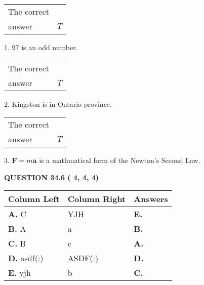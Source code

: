 \documentclass[12pt]{article}
\begin{document}
 
\noindent\begin{tabular}{|l|l|}\hline The correct & \\
          answer &  %
$T$ \\ \hline \end{tabular}
1. $ %
97$ is an  %
odd number.
 
\noindent\begin{tabular}{|l|l|}\hline The correct & \\
          answer &  %
$T$ \\ \hline \end{tabular}
2.  %
Kingston is in  %
Ontario province.
 
\noindent\begin{tabular}{|l|l|}\hline The correct & \\
          answer &  %
$T$ \\ \hline \end{tabular}
3.  %
$\mathbf{F}=m\mathbf{a}$ is a mathmatical form of  %
the Newton's Second Law.
 
 
 
  
\vspace{0.2in}
  
{\textbf{\Large{QUESTION
34.6 
 (          4,          4,          4)
}}}
  
  
 
 
\noindent{}
  
  
\begin{tabular}{|l|l|l|}
 \hline
 Column Left & Column Right  & Answers       \\ 
 \hline
{\textbf{\large{
A.}}}
C
  & 
YJH
 & 
{\textbf{\large{
E.}}}
 \\ 
 \hline
{\textbf{\large{
B.}}}
A
  & 
a
 & 
{\textbf{\large{
B.}}}
 \\ 
 \hline
{\textbf{\large{
C.}}}
B
  & 
c
 & 
{\textbf{\large{
A.}}}
 \\ 
 \hline
{\textbf{\large{
D.}}}
asdf(:)
  & 
ASDF(:)
 & 
{\textbf{\large{
D.}}}
 \\ 
 \hline
{\textbf{\large{
E.}}}
yjh
  & 
b
 & 
{\textbf{\large{
C.}}}
 \\ 
 \hline
 \end{tabular}
  
  
 
 
 
 
  
\vspace{0.2in}
  
\end{document}
